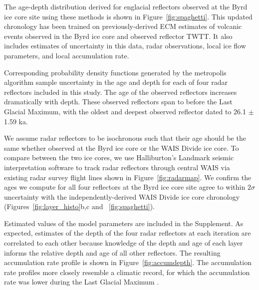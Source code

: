 
The age-depth distribution derived for englacial reflectors observed at the Byrd ice core site using these methods is shown in Figure~\ref{fig:spaghetti}. This updated chronology has been trained on previously-derived ECM estimates of volcanic events observed in the Byrd ice core and observed reflector TWTT. It also includes estimates of uncertainty in this data, radar observations, local ice flow parameters, and local accumulation rate. 

Corresponding probability density functions generated by the metropolis algorithm sample uncertainty in the age and depth for each of four radar reflectors included in this study. The age of the observed reflectors increases dramatically with depth.  These observed reflectors span to before the Last Glacial Maximum, with the oldest and deepest observed reflector dated to 26.1 $\pm$ 1.59 ka. 

We assume radar reflectors to be isochronous such that their age should be the same whether observed at the Byrd ice core or the WAIS Divide ice core. To compare between the two ice cores, we use Halliburton's Landmark seismic interpretation software to track radar reflectors through central WAIS via existing radar survey flight lines shown in Figure~\ref{fig:radarmap}. We confirm the ages we compute for all four reflectors at the Byrd ice core site agree to within $2\sigma$ uncertainty with the independently-derived WAIS Divide ice core chronology (Figures~\ref{fig:layer_histo}b,c and ~\ref{fig:spaghetti}).

Estimated values of the model parameters are included in the Supplement. As expected, estimates of the depth of the four radar reflectors at each iteration are correlated to each other because knowledge of the depth and age of each layer informs the relative depth and age of all other reflectors. The resulting accumulation rate profile is shown in Figure~\ref{fig:accumdepth}. The accumulation rate profiles more closely resemble a climatic record, for which the accumulation rate was lower during the Last Glacial Maximum%
. 

